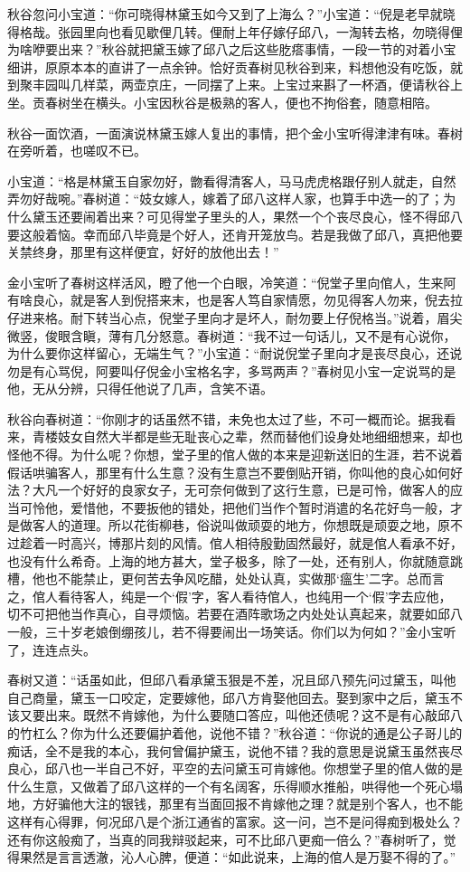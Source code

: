 \documentclass[12pt,UTF8]{ctexbook}
\begin{document}
{{{秋谷忽问小宝道：“你可晓得林黛玉如今又到了上海么？”小宝道：“倪是老早就晓得格哉。张园里向也看见歇俚几转。俚耐上年仔嫁仔邱八，一淘转去格，勿晓得俚为啥咿要出来？”秋谷就把黛玉嫁了邱八之后这些肐瘩事情，一段一节的对着小宝细讲，原原本本的直讲了一点余钟。恰好贡春树见秋谷到来，料想他没有吃饭，就到聚丰园叫几样菜，两壶京庄，一同摆了上来。上宝过来斟了一杯酒，便请秋谷上坐。贡春树坐在横头。小宝因秋谷是极熟的客人，便也不拘俗套，随意相陪。

秋谷一面饮酒，一面演说林黛玉嫁人复出的事情，把个金小宝听得津津有味。春树在旁听着，也嗟叹不已。

小宝道：“格是林黛玉自家勿好，朆看得清客人，马马虎虎格跟仔别人就走，自然弄勿好哉啘。”春树道：“妓女嫁人，嫁着了邱八这样人家，也算手中选一的了；为什么黛玉还要闹着出来？可见得堂子里头的人，果然一个个丧尽良心，怪不得邱八要这般着恼。幸而邱八毕竟是个好人，还肯开笼放鸟。若是我做了邱八，真把他要关禁终身，那里有这样便宜，好好的放他出去！”

金小宝听了春树这样活风，瞪了他一个白眼，冷笑道：“倪堂子里向倌人，生来阿有啥良心，就是客人到倪搭来末，也是客人笃自家情愿，勿见得客人勿来，倪去拉仔进来格。耐下转当心点，倪堂子里向才是坏人，耐勿要上仔倪格当。”说着，眉尖微竖，俊眼含瞋，薄有几分怒意。春树道：“我不过一句话儿，又不是有心说你，为什么要你这样留心，无端生气？”小宝道：“耐说倪堂子里向才是丧尽良心，还说勿是有心骂倪，阿要叫仔倪金小宝格名字，多骂两声？”春树见小宝一定说骂的是他，无从分辨，只得任他说了几声，含笑不语。

秋谷向春树道：“你刚才的话虽然不错，未免也太过了些，不可一概而论。据我看来，青楼妓女自然大半都是些无耻丧心之辈，然而替他们设身处地细细想来，却也怪他不得。为什么呢？你想，堂子里的倌人做的本来是迎新送旧的生涯，若不说着假话哄骗客人，那里有什么生意？没有生意岂不要倒贴开销，你叫他的良心如何好法？大凡一个好好的良家女子，无可奈何做到了这行生意，已是可怜，做客人的应当可怜他，爱惜他，不要扳他的错处，把他们当作个暂时消遣的名花好鸟一般，才是做客人的道理。所以花街柳巷，俗说叫做顽耍的地方，你想既是顽耍之地，原不过趁着一时高兴，博那片刻的风情。倌人相待殷勤固然最好，就是倌人看承不好，也没有什么希奇。上海的地方甚大，堂子极多，除了一处，还有别人，你就随意跳槽，他也不能禁止，更何苦去争风吃醋，处处认真，实做那‘瘟生’二字。总而言之，倌人看待客人，纯是一个‘假’字，客人看待倌人，也纯用一个‘假’字去应他，切不可把他当作真心，自寻烦恼。若要在酒阵歌场之内处处认真起来，就要如邱八一般，三十岁老娘倒绷孩儿，若不得要闹出一场笑话。你们以为何如？”金小宝听了，连连点头。

春树又道：“话虽如此，但邱八看承黛玉狠是不差，况且邱八预先问过黛玉，叫他自己商量，黛玉一口咬定，定要嫁他，邱八方肯娶他回去。娶到家中之后，黛玉不该又要出来。既然不肯嫁他，为什么要随口答应，叫他还债呢？这不是有心敲邱八的竹杠么？你为什么还要偏护着他，说他不错？”秋谷道：“你说的通是公子哥儿的痴话，全不是我的本心，我何曾偏护黛玉，说他不错？我的意思是说黛玉虽然丧尽良心，邱八也一半自己不好，平空的去问黛玉可肯嫁他。你想堂子里的倌人做的是什么生意，又做着了邱八这样的一个有名阔客，乐得顺水推船，哄得他一个死心塌地，方好骗他大注的银钱，那里有当面回报不肯嫁他之理？就是别个客人，也不能这样有心得罪，何况邱八是个浙江通省的富家。这一问，岂不是问得痴到极处么？还有你这般痴了，当真的同我辩驳起来，可不比邱八更痴一倍么？”春树听了，觉得果然是言言透澈，沁人心脾，便道：“如此说来，上海的倌人是万娶不得的了。”

}}}
\end{document}
